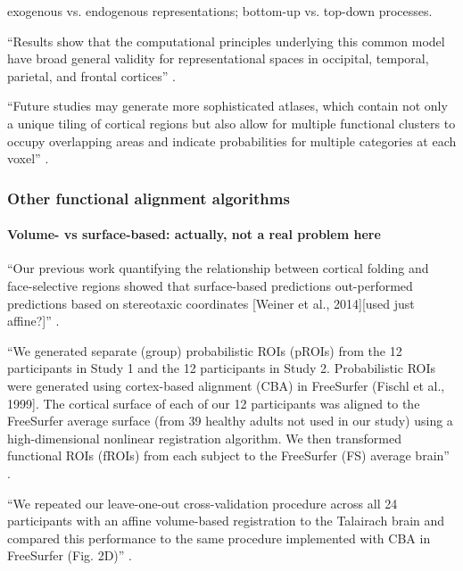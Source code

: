 %
exogenous vs. endogenous representations; bottom-up vs. top-down processes.


``Results show that the computational principles underlying this common
model have broad general validity for representational spaces in occipital,
temporal, parietal, and frontal cortices'' \citep{guntupalli2016model}.

``Future studies may generate more sophisticated atlases, which contain not only
a unique tiling of cortical regions but also allow for multiple functional
clusters to occupy overlapping areas and indicate probabilities for multiple
categories at each voxel'' \citep{rosenke2021probabilistic}.


\subsubsection{Other functional alignment algorithms}

\paragraph{Volume- vs surface-based: actually, not a real problem here}




``Our previous work quantifying the relationship between cortical folding and
face-selective regions showed that surface-based predictions out-performed
predictions based on stereotaxic coordinates [Weiner et al., 2014][used just
affine?]'' \citep{weiner2018defining}.

``We generated separate (group) probabilistic ROIs (pROIs) from the 12
participants in Study 1 and the 12 participants in Study 2.
%
Probabilistic ROIs were generated using cortex-based alignment (CBA) in
FreeSurfer (Fischl et al., 1999].
%
The cortical surface of each of our 12 participants was aligned to the
FreeSurfer average surface (from 39 healthy adults not used in our study) using
a high-dimensional nonlinear registration algorithm.
%
We then transformed functional ROIs (fROIs) from each subject to the FreeSurfer
(FS) average brain'' \citep{weiner2018defining}.


``We repeated our leave-one-out cross-validation procedure across all 24
participants with an affine volume-based registration to the Talairach brain and
compared this performance to the same procedure implemented with CBA in
FreeSurfer (Fig. 2D)'' \citep{weiner2018defining}.


